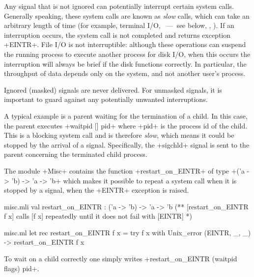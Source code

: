 Any signal that is not ignored can potentially interrupt 
certain system calls.  Generally speaking, these system calls are 
known as \emph{slow} calls, which can take an arbitrary length of time (for
example, terminal I/O, ~---~see below, , \etc).
If an interruption occurs, the system call is not completed and
returns exception \ml+EINTR+.  File I/O is not interruptible:
although these operations can suspend the running process to 
execute another process for disk I/O, when this occurs the interruption
will always be brief if the disk functions correctly.  In particular, 
the throughput of data depends only on the system, and not another user's
process.

Ignored (masked) signals are never delivered.  For unmasked 
signals, it is important to guard against any potentially 
unwanted interruptions.

A typical example is a parent waiting for the termination of a child.
In this case, the parent executes \ml+waitpid [] pid+ where \ml+pid+ 
is the process id of the child.  This is a blocking system call and 
is therefore \emph{slow}, which means it could be stopped by the 
arrival of a signal.  Specifically, the \ml+sigchld+ signal is sent 
to the parent concerning the terminated child process.

The module \ml+Misc+ contains the function
\ml+restart_on_EINTR+ of type \ml+('a -> 'b) -> 'a -> 'b+ which
makes it possible to repeat a system call when it is stopped
by a signal, \ie{} when the \ml+EINTR+ exception is raised.

%
\begin{codefile}{misc.mli}
val restart_on_EINTR : ('a -> 'b) -> 'a -> 'b
(** [restart_on_EINTR f x] calls [f x] repeatedly until it does not fail
with [EINTR] *)
\end{codefile}
%
\begin{listingcodefile}{misc.ml}
let rec restart_on_EINTR f x = 
  try f x with Unix_error (EINTR, _, _) -> restart_on_EINTR f x
\end{listingcodefile}
\label{restart_on_EINTR}%
To wait on a child correctly one simply writes
\ml+restart_on_EINTR (waitpid flags) pid+.

